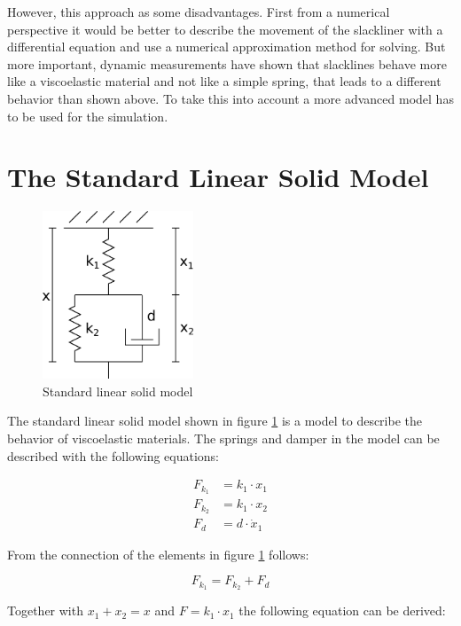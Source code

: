 However, this approach as some disadvantages. First from a numerical perspective it would be better to describe the movement of the slackliner with a differential equation and use a numerical approximation method for solving. But more important, dynamic measurements have shown that slacklines behave more like a viscoelastic material and not like a simple spring, that leads to a different behavior than shown above. To take this into account a more advanced model has to be used for the simulation.

\section{The Standard Linear Solid Model}

\begin{figure}[htb] \centering
	\includegraphics[width=0.4\textwidth]{images/dynamicStandardModel.pdf}
	\caption{Standard linear solid model}
	\label{fig:dynamicStandardModel}
\end{figure}

The standard linear solid model shown in figure \ref{fig:dynamicStandardModel} is a model to describe the behavior of viscoelastic materials. The springs and damper in the model can be described with the following equations:

\begin{align}
F_{k_1} &= k_1 \cdot x_1 \\
F_{k_2} &= k_1 \cdot x_2 \\
F_{d} &= d \cdot \dot x_1
\end{align}

From the connection of the elements in figure \ref{fig:dynamicStandardModel} follows:

\begin{equation}
	F_{k_1} = F_{k_2} + F_d
\end{equation}

Together with $x_1 + x_2 = x$ and $F = k_1 \cdot x_1$ the following equation can be derived:

